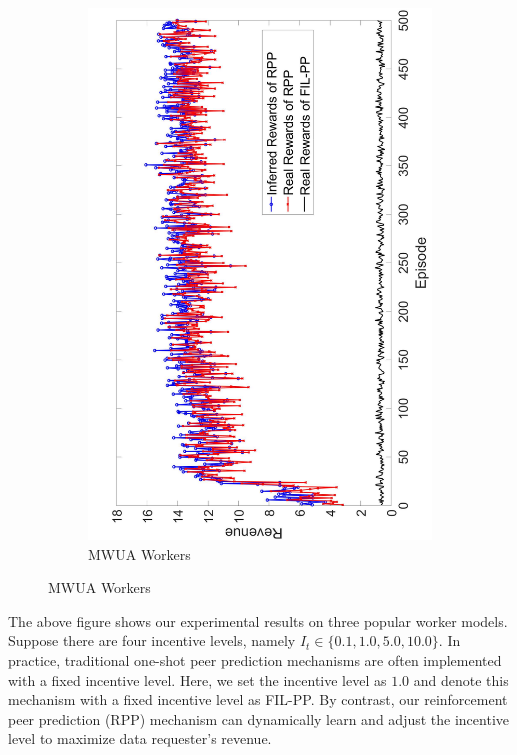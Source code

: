 \documentclass{article}
\begin{document}
\begin{figure}[htb]
\begin{subfigure}[t]{0.35\textwidth}
        \includegraphics[width=\textwidth]{image/3}
        \caption{\label{E3}  MWUA Workers}
    \end{subfigure}    
    \vspace{-1mm}
\end{figure}
The above figure %
shows our experimental results on three popular worker models.
Suppose there are four incentive levels, namely $I_t\in \{0.1, 1.0, 5.0, 10.0\}$.
In practice, traditional one-shot peer prediction mechanisms are often implemented with a fixed incentive level.
Here, we set the incentive level as $1.0$ and denote this mechanism with a fixed incentive level as FIL-PP.
By contrast, our reinforcement peer prediction (RPP) mechanism can dynamically learn and adjust the incentive level to maximize data requester's revenue.
\end{document}
